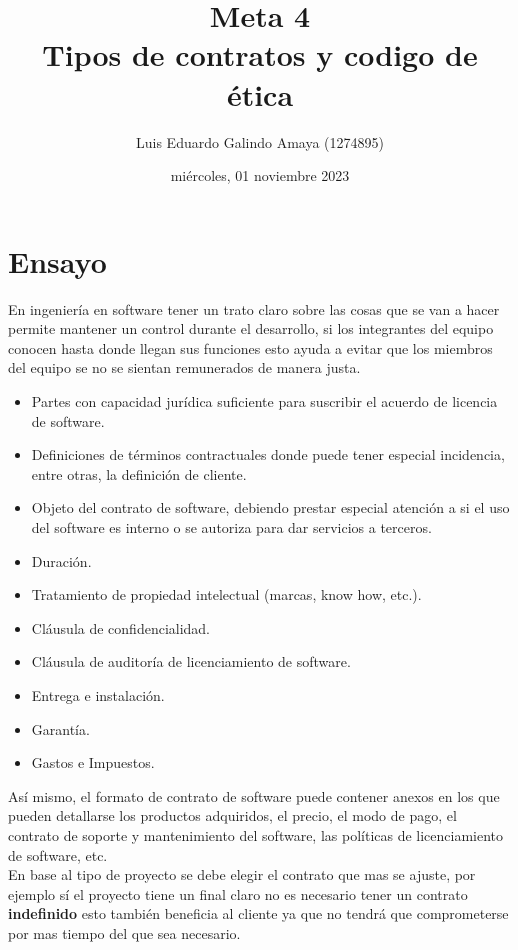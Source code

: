 \documentclass[11pt]{article}
\author{Luis Eduardo Galindo Amaya (1274895)}
\date{miércoles, 01 noviembre 2023}
\title{Meta 4\\\medskip
\large Tipos de contratos y codigo de ética}
\begin{document}

\section{Ensayo}
\label{sec:org61e65de}
En ingeniería en software tener un trato claro sobre las cosas que se
van a hacer permite mantener un control durante el desarrollo, si los
integrantes del equipo conocen hasta donde llegan sus funciones esto
ayuda a evitar que los miembros del equipo se no se sientan
remunerados de manera justa.

\begin{itemize}
\item Partes con capacidad jurídica suficiente para suscribir el acuerdo
de licencia de software.
\item Definiciones de términos contractuales donde puede tener especial
incidencia, entre otras, la definición de cliente.
\item Objeto del contrato de software, debiendo prestar especial atención
a si el uso del software es interno o se autoriza para dar servicios
a terceros.
\item Duración.
\item Tratamiento de propiedad intelectual (marcas, know how, etc.).
\item Cláusula de confidencialidad.
\item Cláusula de auditoría de licenciamiento de software.
\item Entrega e instalación.
\item Garantía.
\item Gastos e Impuestos.
\end{itemize}

Así mismo, el formato de contrato de software puede contener anexos en
los que pueden detallarse los productos adquiridos, el precio, el modo
de pago, el contrato de soporte y mantenimiento del software, las
políticas de licenciamiento de software, etc. \\

En base al tipo de proyecto se debe elegir el contrato que mas se
ajuste, por ejemplo sí el proyecto tiene un final claro no es
necesario tener un contrato \textbf{indefinido} esto también beneficia al
cliente ya que no tendrá que comprometerse por mas tiempo del que sea
necesario. 
\end{document}
